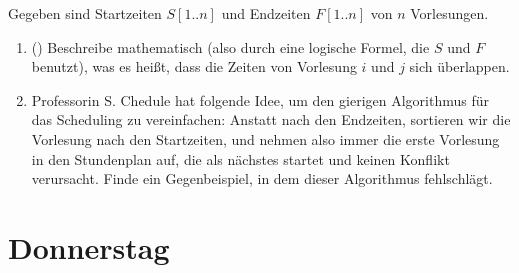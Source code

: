 \documentclass{uebung_cs}
\begin{document}
\begin{aufgabe}[Scheduling]
    Gegeben sind Startzeiten $S[1..n]$ und Endzeiten $F[1..n]$ von $n$ Vorlesungen.
    \begin{enumerate}
        \item(\warmup) Beschreibe mathematisch (also durch eine logische Formel, die $S$ und $F$ benutzt), was es heißt, dass die Zeiten von Vorlesung $i$ und $j$ sich überlappen.
        \item Professorin S. Chedule hat folgende Idee, um den gierigen Algorithmus für das Scheduling zu vereinfachen: Anstatt nach den Endzeiten, sortieren wir die Vorlesung nach den Startzeiten, und nehmen also immer die erste Vorlesung in den Stundenplan auf, die als nächstes startet und keinen Konflikt verursacht. Finde ein Gegenbeispiel, in dem dieser Algorithmus fehlschlägt.
    \end{enumerate}
\end{aufgabe}

\section*{Donnerstag}
\begin{aufgabe}

\end{aufgabe}

\begin{aufgabe}[Balance]
    
\end{aufgabe}
    
\begin{aufgabe}
\end{aufgabe}
\end{document}
